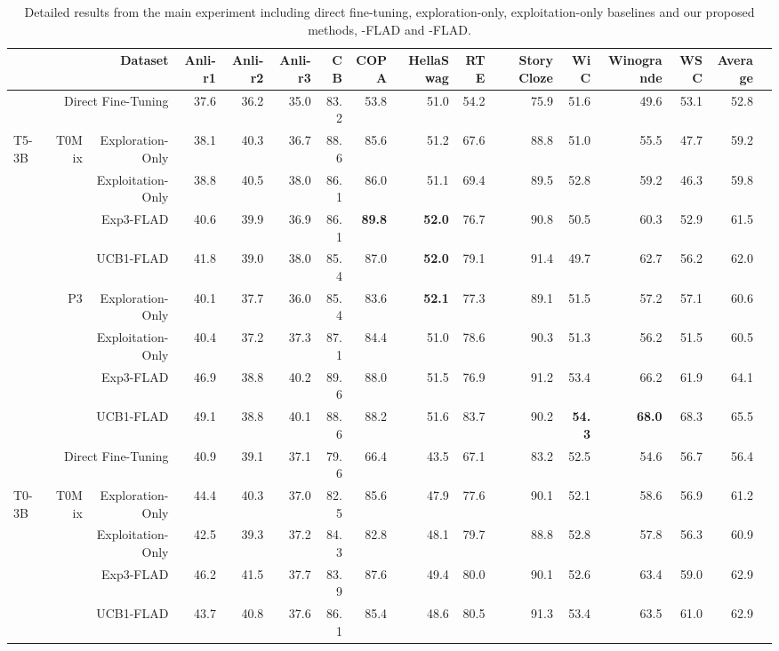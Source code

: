 \begin{table}
\centering
\small
\label{tab:detailed_results}
\caption{Detailed results from the main experiment including direct fine-tuning, exploration-only, exploitation-only baselines and our proposed methods, \ex{}-FLAD and \ucb{}-FLAD.}
\begin{adjustbox}{angle=-90}
\begin{tabular}{|lrr|r|r|r|r|r|r|r|r|r|r|r|r|r}\toprule
\multicolumn{3}{r|}{Dataset} &Anli-r1 &Anli-r2 &Anli-r3 &CB &COPA &HellaSwag &RTE &Story Cloze &WiC &Winogrande &WSC &Average \\
\hline
&\multicolumn{2}{r|}{Direct Fine-Tuning} &37.6 &36.2 &35.0 &83.2 &53.8 &51.0 &54.2 &75.9 &51.6 &49.6 &53.1 &52.8 \\
\multirow{8}{*}{T5-3B} &\multirow{ 4}{*}{T0Mix} &Exploration-Only &38.1 &40.3 &36.7 &88.6 &85.6 &51.2 &67.6 &88.8 &51.0 &55.5 &47.7 &59.2 \\
& &Exploitation-Only &38.8 &40.5 &38.0 &86.1 &86.0 &51.1 &69.4 &89.5 &52.8 &59.2 &46.3 &59.8 \\
& &Exp3-FLAD &40.6 &39.9 &36.9 &86.1 &\textbf{89.8} &\textbf{52.0} &76.7 &90.8 &50.5 &60.3 &52.9 &61.5 \\
& &UCB1-FLAD &41.8 &39.0 &38.0 &85.4 &87.0 &\textbf{52.0} &79.1 &91.4 &49.7 &62.7 &56.2 &62.0 \\
\cmidrule{2-15}
& \multirow{4}{*}{P3} &Exploration-Only &40.1 &37.7 &36.0 &85.4 &83.6 &\textbf{52.1} &77.3 &89.1 &51.5 &57.2 &57.1 &60.6 \\
& &Exploitation-Only &40.4 &37.2 &37.3 &87.1 &84.4 &51.0 &78.6 &90.3 &51.3 &56.2 &51.5 &60.5 \\
& &Exp3-FLAD &46.9 &38.8 &40.2 &89.6 &88.0 &51.5 &76.9 &91.2 &53.4 &66.2 &61.9 &64.1 \\
& &UCB1-FLAD &49.1 &38.8 &40.1 &88.6 &88.2 &51.6 &83.7 &90.2 &\textbf{54.3} &\textbf{68.0} &68.3 &65.5 \\
\hline
 &\multicolumn{2}{r|}{Direct Fine-Tuning} &40.9 &39.1 &37.1 &79.6 &66.4 &43.5 &67.1 &83.2 &52.5 &54.6 &56.7 &56.4 \\
\multirow{8}{*}{T0-3B} &\multirow{ 4}{*}{T0Mix} &Exploration-Only &44.4 &40.3 &37.0 &82.5 &85.6 &47.9 &77.6 &90.1 &52.1 &58.6 &56.9 &61.2 \\
& &Exploitation-Only &42.5 &39.3 &37.2 &84.3 &82.8 &48.1 &79.7 &88.8 &52.8 &57.8 &56.3 &60.9 \\
& &Exp3-FLAD &46.2 &41.5 &37.7 &83.9 &87.6 &49.4 &80.0 &90.1 &52.6 &63.4 &59.0 &62.9 \\
& &UCB1-FLAD &43.7 &40.8 &37.6 &86.1 &85.4 &48.6 &80.5 &91.3 &53.4 &63.5 &61.0 &62.9 \\

\end{tabular}
\end{adjustbox}
\end{table}
